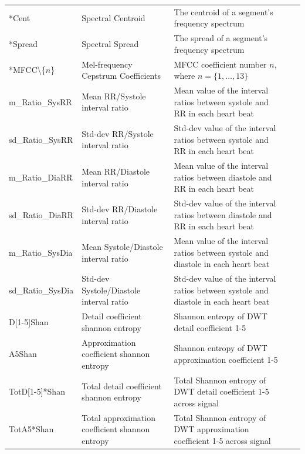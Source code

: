 \documentclass[titlepage, 12pt]{scrartcl} \usepackage{enumitem}
\begin{document}
\begin{table}[H]
\begin{tabulary}{\linewidth}{LLLLL}
*Cent                      & Spectral Centroid                               & The centroid of a segment's frequency spectrum                                       \\
*Spread                    & Spectral Spread                                 & The spread of a segment's frequency spectrum                                         \\
*MFCC\textbackslash\{$n$\} & Mel-frequency Cepstrum Coefficients             & MFCC coefficient number $n$, where $n = \{1, \ldots, 13\}$                           \\
m\_Ratio\_SysRR            & Mean RR/Systole interval ratio                  & Mean value of the interval ratios between systole and RR in each heart beat          \\
sd\_Ratio\_SysRR           & Std-dev RR/Systole interval ratio               & Std-dev value of the interval ratios between systole and RR in each heart beat       \\
m\_Ratio\_DiaRR            & Mean RR/Diastole interval ratio                 & Mean value of the interval ratios between diastole and RR in each heart beat         \\
sd\_Ratio\_DiaRR           & Std-dev RR/Diastole interval ratio              & Std-dev value of the interval ratios between diastole and RR in each heart beat      \\
m\_Ratio\_SysDia           & Mean Systole/Diastole interval ratio            & Mean value of the interval ratios between systole and diastole in each heart beat    \\
sd\_Ratio\_SysDia          & Std-dev Systole/Diastole interval ratio         & Std-dev value of the interval ratios between systole and diastole in each heart beat \\
D{[}1-5{]}Shan             & Detail coefficient shannon entropy              & Shannon entropy of DWT detail coefficient 1-5                                        \\
A5Shan                     & Approximation coefficient shannon entropy       & Shannon entropy of DWT approximation coefficient 1-5                                 \\
TotD{[}1-5{]}*Shan         & Total detail coefficient shannon entropy        & Total Shannon entropy of DWT detail coefficient 1-5 across signal                    \\
TotA5*Shan                 & Total approximation coefficient shannon entropy & Total Shannon entropy of DWT approximation coefficient 1-5 across signal             \\ \hline
\end{tabulary}
\end{table}
\pagebreak
\end{document}
